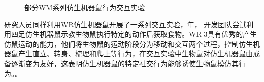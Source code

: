 \begin{figure}[htbp]
  \centering
  \caption{部分WM系列仿生机器鼠行为交互实验} \label{figure_wminteract}
\end{figure}

研究人员同样利用WR仿生机器鼠开展了一系列交互实验，\citeyear{laschiDesignDevelopmentLegged2006a}年，
开发团队尝试利用四足仿生机器鼠示教生物鼠执行特定的动作后获取食物\cite{laschiDesignDevelopmentLegged2006a}。WR-3具有优秀的产生仿鼠运动的能力，他们将生物鼠的运动阶段分为移动和交互两个过程，控制仿生机器鼠产生直立、转身、梳理和爬上等行为，在交互实验中生物鼠对仿生机器鼠由戒备逐渐变为友好，这表明仿生机器鼠的特定社交行为能够诱使生物鼠模仿其行为。\cite{shiDevelopmentHybridWheellegged2010}。


